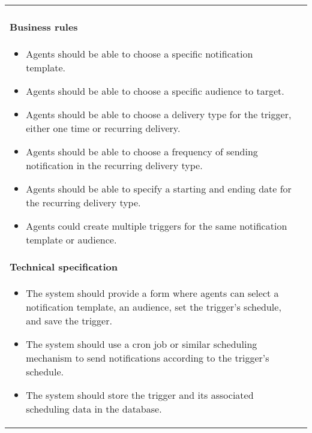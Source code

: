 \begin{longtable}{ | m{} | m{} | }
\begin{itemize}
    \end{itemize}
    \paragraph*{Business rules} \mbox{} \newline
    \begin{itemize}
        \item Agents should be able to choose a specific notification template.
        \item Agents should be able to choose a specific audience to target.
        \item Agents should be able to choose a delivery type for the trigger, either one time or recurring delivery.
        \item Agents should be able to choose a frequency of sending notification in the recurring delivery type.
        \item Agents should be able to specify a starting and ending date for the recurring delivery type.
        \item Agents could create multiple triggers for the same notification template or audience.
    \end{itemize}
    \paragraph*{Technical specification} \mbox{} \newline
    \begin{itemize}
        \item The system should provide a form where agents can select a notification template, an audience,
              set the trigger's schedule, and save the trigger.
        \item The system should use a cron job or similar scheduling mechanism to send notifications
              according to the trigger's schedule.
        \item The system should store the trigger and its associated scheduling data in the database.
    \end{itemize}

\end{longtable}
